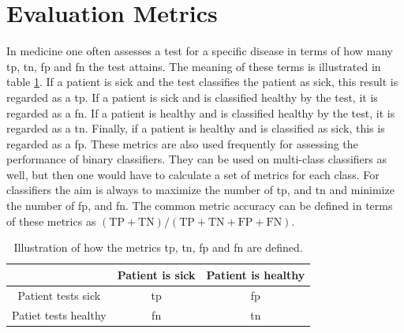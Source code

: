\section{Evaluation Metrics} \label{sec:eval_metrics}
In medicine one often assesses a test for a specific disease in terms of how many \acrfull{tp}, \acrfull{tn}, \acrfull{fp} and \acrfull{fn} the test attains. The meaning of these terms is illustrated in table \ref{tab:ttpnffpn}. If a patient is sick and the test classifies the patient as sick, this result is regarded as a \acrlong{tp}. If a patient is sick and is classified healthy by the test, it is regarded as a \acrlong{fn}. If a patient is healthy and is classified healthy by the test, it is regarded as a \acrlong{tn}. Finally, if a patient is healthy and is classified as sick, this is regarded as a \acrlong{fp}. These metrics are also used frequently for assessing the performance of binary classifiers. They can be used on multi-class classifiers as well, but then one would have to calculate a set of metrics for each class. For classifiers the aim is always to maximize the number of \acrshort{tp}, and \acrshort{tn} and minimize the number of \acrshort{fp}, and \acrshort{fn}. The common metric accuracy can be defined in terms of these metrics as $(\mathrm{TP} + \mathrm{TN}) / (\mathrm{TP} + \mathrm{TN} + \mathrm{FP} + \mathrm{FN})$.

\begin{table}
    \centering
    \begin{tabular}{c|c|c|}
        \toprule
                             & Patient is sick & Patient is healthy \\
        \midrule
        Patient tests sick   & \acrshort{tp}   & \acrshort{fp} \\
        \midrule
        Patiet tests healthy & \acrshort{fn}   & \acrshort{tn} \\
        \bottomrule
    \end{tabular}
    \caption{Illustration of how the metrics \acrshort{tp}, \acrshort{tn}, \acrfull{fp} and \acrfull{fn} are defined.}
    \label{tab:ttpnffpn}
\end{table}

